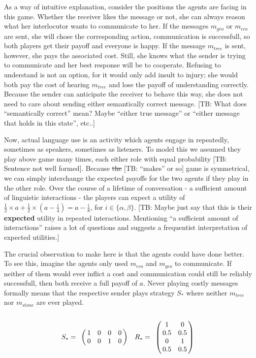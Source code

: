 \documentclass[10pt]{article}
\newcommand{\tb}[1]{\textcolor[rgb]{.8,.33,.0}{[TB: #1]}}%
\begin{document}
As a way of intuitive explanation, consider the positions the agents are facing in this game. Whether the receiver likes the message or not, she can always reason what her interlocutor wants to communicate to her. If the messages $m_{geo}$ or $m_{eco}$ are sent, she will chose the corresponding action, communication is successfull, so both players get their payoff and everyone is happy. If the message $m_{tree}$ is sent, however, she pays the associated cost. Still, she knows what the sender is trying to communicate and her best response will be to cooperate. Refusing to understand is not an option, for it would only add insult to injury; she would both pay the cost of hearing $m_{tree}$ and lose the payoff of understanding correctly. Because the sender can anticipate the receiver to behave this way, she does not need to care about sending either semantically correct message. \tb{What does ``semantically correct'' mean? Maybe ``either true message'' or ``either message that holds in this state'', etc..}

Now, actual language use is an activity which agents engage in repeatedly, sometimes as speakers, sometimes as listeners. To model this we assumed they play above game many times, each either role with equal probability \tb{Sentence not well formed}. Because \sout{the} \tb{``makes'' or so} game is symmetrical, we can simply interchange the expected payoffs for the two agents if they play in the other role. Over the course of a lifetime of conversation - a sufficient amount of linguistic interactions - the players can expect a utility of $\tfrac{1}{2}\times a + \tfrac{1}{2}\times (a-\tfrac{i}{4})=a-\tfrac{i}{8}$, for $i\in \{\alpha,\beta \}$. \tb{Maybe just say that this is their {\bf expected} utility in repeated interactions. Mentioning ``a sufficient amount of interactions'' raises a lot of questions and suggests a frequentist interpretation of expected utilities.}

The crucial observation to make here is that the agents could have done better. To see this, imagine the agents only used $m_{eco}$ and $m_{geo}$ to communicate. If neither of them would ever inflict a cost and communication could still be reliably successfull, then both receive a full payoff of $a$.
Never playing costly messages formally means that the respective sender plays strategy $S_*$ where neither $m_{tree}$ nor $m_{stone}$ are ever played.
\begin{equation*}
S_*=
\bordermatrix{
            & & & &    \cr
 &       1 &    0      & 0       & 0 \cr
 &       0 &         0 & 1      & 0
 }\quad
R_*= \bordermatrix{
           &  & \cr
   & 1 & 0 \cr
    & 0.5 & 0.5 \cr
    & 0 & 1 \cr
    & 0.5 & 0.5 \cr
}
\end{equation*}
\end{document}
